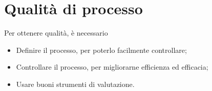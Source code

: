 \section{Qualità di processo}

Per ottenere qualità, è necessario

\begin{itemize}
  \item Definire il processo, per poterlo facilmente controllare;
  \item Controllare il processo, per migliorarne efficienza ed efficacia;
  \item Usare buoni strumenti di valutazione.
\end{itemize}
